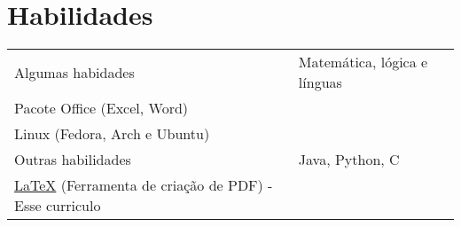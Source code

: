 \documentclass[a4paper,12pt]{article}
\begin{document}
\section{Habilidades}
\begin{tabularx}{\linewidth}{@{}l X@{}}
Algumas habidades &  \normalsize{Matemática, lógica e línguas}\\
\normalsize{Pacote Office (Excel, Word)}\\ 
\normalsize{Linux (Fedora, Arch e Ubuntu)}  \\
Outras habilidades  &  \normalsize{ Java, Python, C}\\ 
\href{https://www.latex-project.org/}{\LaTeX} (Ferramenta de criação de PDF) - Esse curriculo
\end{tabularx}

\vfill
{}
\end{document}
